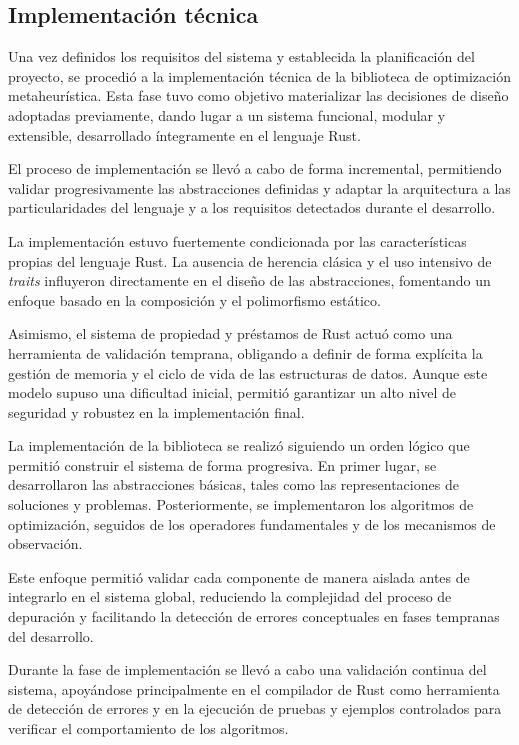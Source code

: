 \documentclass[12pt,a4paper,twoside,openright]{book}
\begin{document}
    \subsection{Implementación técnica}

    Una vez definidos los requisitos del sistema y establecida la planificación del proyecto, se procedió a la implementación técnica de la biblioteca de optimización metaheurística. Esta fase tuvo como objetivo materializar las decisiones de diseño adoptadas previamente, dando lugar a un sistema funcional, modular y extensible, desarrollado íntegramente en el lenguaje Rust.

    El proceso de implementación se llevó a cabo de forma incremental, permitiendo validar progresivamente las abstracciones definidas y adaptar la arquitectura a las particularidades del lenguaje y a los requisitos detectados durante el desarrollo.

    La implementación estuvo fuertemente condicionada por las características propias del lenguaje Rust. La ausencia de herencia clásica y el uso intensivo de \emph{traits} influyeron directamente en el diseño de las abstracciones, fomentando un enfoque basado en la composición y el polimorfismo estático.

    Asimismo, el sistema de propiedad y préstamos de Rust actuó como una herramienta de validación temprana, obligando a definir de forma explícita la gestión de memoria y el ciclo de vida de las estructuras de datos. Aunque este modelo supuso una dificultad inicial, permitió garantizar un alto nivel de seguridad y robustez en la implementación final.

    La implementación de la biblioteca se realizó siguiendo un orden lógico que permitió construir el sistema de forma progresiva. En primer lugar, se desarrollaron las abstracciones básicas, tales como las representaciones de soluciones y problemas. Posteriormente, se implementaron los algoritmos de optimización, seguidos de los operadores fundamentales y de los mecanismos de observación.

    Este enfoque permitió validar cada componente de manera aislada antes de integrarlo en el sistema global, reduciendo la complejidad del proceso de depuración y facilitando la detección de errores conceptuales en fases tempranas del desarrollo.

    Durante la fase de implementación se llevó a cabo una validación continua del sistema, apoyándose principalmente en el compilador de Rust como herramienta de detección de errores y en la ejecución de pruebas y ejemplos controlados para verificar el comportamiento de los algoritmos.
\end{document}
